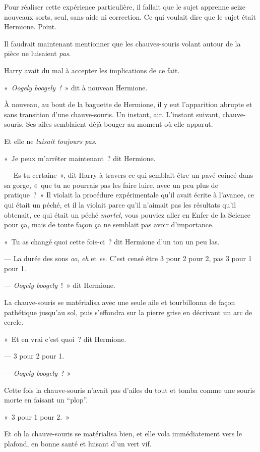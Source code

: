 Pour réaliser cette expérience particulière, il fallait que le sujet apprenne seize nouveaux sorts, seul, sans aide ni correction.
Ce qui voulait dire que le sujet était Hermione.
Point.

Il faudrait maintenant mentionner que les chauves-souris volant autour de la pièce ne luisaient \emph{pas}.

Harry avait du mal à accepter les implications de ce fait.

«~\emph{Oogely boogely~!}~» dit à nouveau Hermione.

À nouveau, au bout de la baguette de Hermione, il y eut l'apparition abrupte et sans transition d'une chauve-souris.
Un instant, air.
L'instant suivant, chauve-souris.
Ses ailes semblaient déjà bouger au moment où elle apparut.

Et elle ne \emph{luisait toujours pas}.

«~Je peux m'arrêter maintenant~? dit Hermione.

--- Es-tu certaine~», dit Harry à travers ce qui semblait être un pavé coincé dans sa gorge, «~que tu ne pourrais pas les faire luire, avec un peu plus de pratique~?~»
Il violait la procédure expérimentale qu'il avait écrite à l'avance, ce qui était un péché, et il la violait parce qu'il n'aimait pas les résultats qu'il obtenait, ce qui était un péché \emph{mortel}, vous pouviez aller en Enfer de la Science pour ça, mais de toute façon ça ne semblait pas avoir d'importance.

«~Tu as changé quoi cette fois-ci~? dit Hermione d'un ton un peu las.

--- La durée des sons \emph{oo}, \emph{eh} et \emph{ee}.
C'est censé être 3 pour 2 pour 2, pas 3 pour 1 pour 1.

--- \emph{Oogely boogely}~!~»
dit Hermione.

La chauve-souris se matérialisa avec une seule aile et tourbillonna de façon pathétique jusqu'au sol, puis s'effondra sur la pierre grise en décrivant un arc de cercle.

«~Et en vrai c'est quoi~? dit Hermione.

--- 3 pour 2 pour 1.

--- \emph{Oogely boogely~!}~»

Cette fois la chauve-souris n'avait pas d'ailes du tout et tomba comme une souris morte en faisant un “plop”.

«~3 pour 1 pour 2.~»

Et oh la chauve-souris se matérialisa bien, et elle vola immédiatement vers le plafond, en bonne santé et luisant d'un vert vif.


